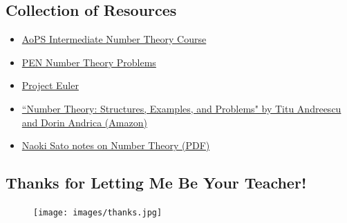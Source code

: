 \clearpage

\subsection{Collection of Resources}
\begin{itemize}
	\item \href{http://artofproblemsolving.com/school/course/catalog/intermediate-numbertheory}{AoPS Intermediate Number Theory Course}
	\item \href{http://www.artofproblemsolving.com/community/c3210_pen_problems}{PEN Number Theory Problems}
	\item \href{https://projecteuler.net/}{Project Euler}
	\item \href{https://www.amazon.com/Number-Theory-Structures-Examples-Problems/dp/081763245X}{``Number Theory: Structures, Examples, and Problems" by Titu Andreescu and Dorin Andrica (Amazon)}
	\item \href{http://artofproblemsolving.com/articles/files/SatoNT.pdf}{Naoki Sato notes on Number Theory (PDF)}
\end{itemize}

\subsection{Thanks for Letting Me Be Your Teacher!}
\begin{figure}[h]
	\centering\texttt{[image: images/thanks.jpg]}
\end{figure}


\clearpage
\thispagestyle{empty} %



\clearpage







